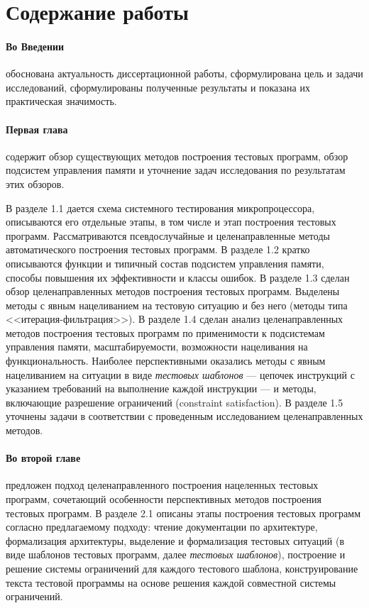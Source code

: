 \documentclass[14pt,autoref,href
,facsimile
]{disser}
\begin{document}
%
%


\section*{Содержание работы}

\paragraph{Во Введении} обоснована актуальность диссертационной работы,
сформулирована цель и задачи исследований, сформулированы полученные результаты и показана их
практическая значимость.

%
%


\paragraph{Первая глава} содержит обзор существующих методов построения тестовых программ, обзор подсистем управления памяти и уточнение задач исследования по результатам этих обзоров.

В разделе 1.1 дается схема системного тестирования микропроцессора, описываются его отдельные этапы, в том числе и этап построения тестовых программ. Рассматриваются псевдослучайные и целенаправленные методы автоматического построения тестовых программ. В разделе 1.2 кратко описываются функции и типичный состав подсистем управления памяти, способы повышения их эффективности и классы ошибок. В разделе 1.3 сделан обзор целенаправленных методов построения тестовых программ. Выделены методы с явным нацеливанием на тестовую ситуацию и без него (методы типа <<итерация-фильтрация>>). В разделе 1.4 сделан анализ целенаправленных методов построения тестовых программ по применимости к подсистемам управления памяти, масштабируемости, возможности нацеливания на функциональность. Наиболее перспективными оказались методы с явным нацеливанием на ситуации в виде \emph{тестовых шаблонов} --- цепочек инструкций с указанием требований на выполнение каждой инструкции --- и методы, включающие разрешение ограничений (constraint satisfaction). В разделе 1.5 уточнены задачи в соответствии с проведенным исследованием целенаправленных методов.

\paragraph{Во второй главе} предложен подход целенаправленного построения нацеленных тестовых программ, сочетающий особенности перспективных методов построения тестовых программ. В разделе 2.1 описаны этапы построения тестовых программ согласно предлагаемому подходу: чтение документации по архитектуре, формализация архитектуры, выделение и формализация тестовых ситуаций (в виде шаблонов тестовых программ, далее \emph{тестовых шаблонов}), построение и решение системы ограничений для каждого тестового шаблона, конструирование текста тестовой программы на основе решения каждой совместной системы ограничений.
\end{document}
